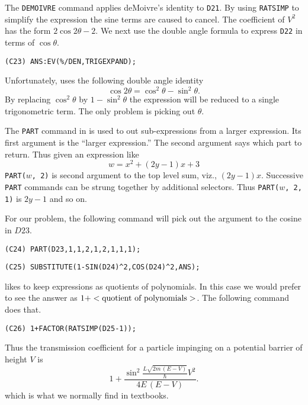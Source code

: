 The {\tt DEMOIVRE} command applies deMoivre's identity to {\tt D21}.  By
using {\tt RATSIMP} to simplify the expression the sine terms are caused to
cancel.  The coefficient of $V^2$ has the form $2 \cos 2 \theta - 2$.  We
next use the double angle formula to express {\tt D22} in terms of $\cos
\theta$.

\begin{verbatim}
(C23) ANS:EV(%/DEN,TRIGEXPAND);
\end{verbatim}
Unfortunately, {\Macsyma} uses the following double angle identity
\[
\cos 2\theta = \cos^2 \theta - \sin^2 \theta.
\]
By replacing $\cos^2 \theta$ by $1 - \sin^2 \theta$ the expression will be
reduced to a single trigonometric term.  The only problem is picking out
$\theta$.  

The {\tt PART} command in {\Macsyma} is used to out sub-expressions from
a larger expression.  Its first argument is the ``larger expression.''
The second argument says which part to return.  Thus given an
expression like
\[
w = x^2 + (2y - 1) x + 3
\]
{\tt PART($w$, 2)} is second argument to the top level sum, viz.,
$(2y-1) x$.  Successive {\tt PART} commands can be strung together by
additional selectors.  Thus {\tt PART($w$, 2, 1)} is $2y-1$ and so on.

For our problem, the following command will pick out the argument to the
cosine in $D23$.

\begin{verbatim}
(C24) PART(D23,1,1,2,1,2,1,1,1);
\end{verbatim} 
\begin{verbatim}
(C25) SUBSTITUTE(1-SIN(D24)^2,COS(D24)^2,ANS);
\end{verbatim}
{\Macsyma} likes to keep expressions as quotients of polynomials.  In this case
we would prefer to see the answer as $1 + <\hbox{quotient of polynomials}>$.
The following command does that. 
\begin{verbatim}
(C26) 1+FACTOR(RATSIMP(D25-1));
\end{verbatim}
Thus the transmission coefficient for a particle impinging on a potential
barrier of height $V$ is
\[
1 + \frac{\sin^2 \frac{L \sqrt{2 m\,(E - V)}}{\hslash} V^2}{4 E \, (E - V)}.
\]
which is what we normally find in textbooks.

